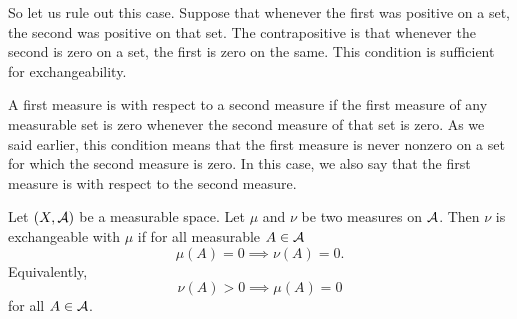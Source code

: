 So let us rule out this case.
Suppose that whenever the
first was positive on a set,
the second was positive on that set.
The contrapositive is that
whenever the second is zero
on a set, the first is zero on the same.
This condition
is sufficient for exchangeability.

A first measure is 
with respect to a second measure
if the first measure of any measurable
set is zero whenever the second measure
of that set is zero.
As we said earlier, this condition
means that the first measure
is never nonzero on a set for which
the second measure is zero.
In this case, we also say that
the first measure is
with respect to the second measure.


Let $(X, \mathcal{A})$ be a measurable space.
Let $\mu$ and $\nu$ be two measures
on $\mathcal{A}$.
Then $\nu$ is exchangeable with $\mu$
if for all measurable $A \in \mathcal{A}$
\[
  \mu(A) = 0 \implies \nu(A) = 0.
\]
Equivalently,
\[
  \nu(A) > 0 \implies \mu(A) = 0
\]
for all $A \in \mathcal{A}$.
\strats
